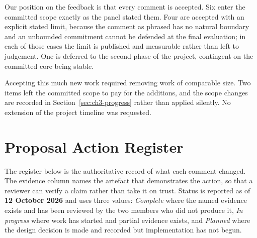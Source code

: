 Our position on the feedback is that every comment is accepted. Six enter the
committed scope exactly as the panel stated them. Four are accepted with an
explicit stated limit, because the comment as phrased has no natural boundary
and an unbounded commitment cannot be defended at the final evaluation; in each
of those cases the limit is published and measurable rather than left to
judgement. One is deferred to the second phase of the project, contingent on the
committed core being stable.

Accepting this much new work required removing work of comparable size. Two
items left the committed scope to pay for the additions, and the scope changes
are recorded in Section~\ref{sec:ch3-progress} rather than applied silently.
No extension of the project timeline was requested.

\section{Proposal Action Register}

The register below is the authoritative record of what each comment changed. The
evidence column names the artefact that demonstrates the action, so that a
reviewer can verify a claim rather than take it on trust. Status is reported as
of \textbf{12 October 2026} and uses three values: \emph{Complete} where the named
evidence exists and has been reviewed by the two members who did not produce it,
\emph{In progress} where work has started and partial evidence exists, and
\emph{Planned} where the design decision is made and recorded but implementation
has not begun.


